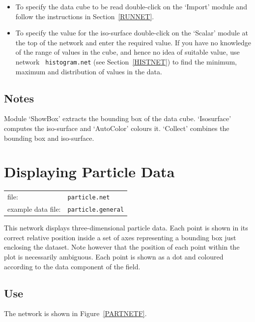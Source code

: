 \documentclass[twoside,11pt]{article}
\newcommand{\xlabel}[1]{}
\begin{document}
\begin{itemize}

  \item To specify the data cube to be read double-click on the `Import'
   module and follow the instructions in Section~\ref{RUNNET}.

  \item To specify the value for the iso-surface double-click on the
   `Scalar' module at the top of the network and enter the required
   value.  If you have no knowledge of the range of values in the
   cube, and hence no idea of suitable value, use network {\tt
   histogram.net} (see Section~\ref{HISTNET}) to find the minimum,
   maximum and distribution of values in the data.

\end{itemize}

\subsection{Notes}

Module `ShowBox' extracts the bounding box of the data cube.
`Isosurface' computes the iso-surface and `AutoColor' colours it.
`Collect' combines the bounding box and iso-surface.


\newpage
\section{\xlabel{PARTNET}Displaying Particle Data}


\begin{tabular}{ll}
file:              & {\tt particle.net}     \\
example data file: & {\tt particle.general} \\
\end{tabular}

This network displays three-dimensional particle data. Each point is
shown in its correct relative position inside a set of axes representing
a bounding box just enclosing the dataset. Note however that the
position of each point within the plot is necessarily ambiguous. Each
point is shown as a dot and coloured according to the data component of
the field.

\subsection{Use}

The network is shown in Figure~\ref{PARTNETF}.
\end{document}
